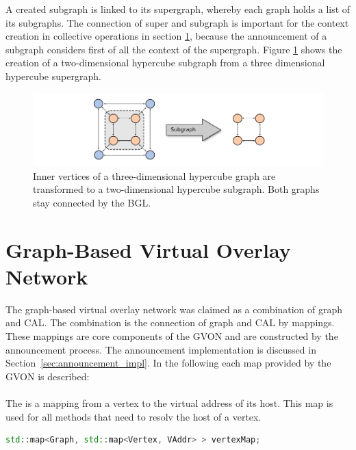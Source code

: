 A created subgraph is linked to its supergraph, whereby each graph
holds a list of its subgraphs. The connection of super and subgraph is
important for the context creation in collective operations in section
\ref{sec:gvon_impl}, because the announcement of a subgraph considers
first of all the context of the supergraph. Figure
\ref{fig:subgraph_creation} shows the creation of a two-dimensional
hypercube subgraph from a three dimensional hypercube supergraph.

\begin{figure}[H]
  \centering
  \includegraphics[width=\textwidth]{graphics/40_subgraph_creation}
  \caption{Inner vertices of a three-dimensional hypercube graph are 
  transformed to a two-dimensional hypercube subgraph. Both graphs
  stay connected by the BGL.}
  \label{fig:subgraph_creation}
\end{figure}

\section{Graph-Based Virtual Overlay Network}
\label{sec:gvon_impl}
The graph-based virtual overlay network was claimed as a combination
of graph and CAL. The combination is the connection of graph and CAL
by mappings. These mappings are core components of the GVON and
are constructed by the announcement process. The announcement implementation  is
discussed in Section~\ref{sec:announcement_impl}. In the following
each map provided by the GVON is described:

\paragraph*{}
\noindent The  is a mapping from a vertex to the virtual
address of its host.  This map is used for all methods
that need to resolv the host of a vertex.
\begin{lstlisting}[language=C++, label=lst:mapping1]
std::map<Graph, std::map<Vertex, VAddr> > vertexMap;
\end{lstlisting}

